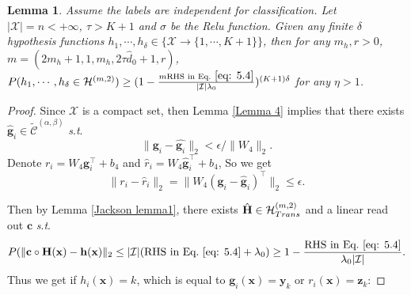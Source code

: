 \documentclass{article}
\theoremstyle{plain}
\newtheorem{lemma}[theorem]{Lemma}
\theoremstyle{definition}
\theoremstyle{remark}
\begin{document}
\begin{lemma}
    Assume the labels are independent for classification. Let $|\mathcal{X}|=n<+\infty$, $\tau>K+1$ and $\sigma$ be the {\rm Relu} function. Given any finite $\delta$ hypothesis functions $h_1,\cdots,h_{\delta}\in \{\mathcal{X}\xrightarrow{}\{1,\cdots,K+1\}\}$, then for any $m_h,r>0$, $m=(2m_h+1,1,m_h,2\tau \hat{d}_0+1,r)$, $P(h_1,\cdots,h_{\delta}\in \mathcal{H}^{(m,2)})\geq (1-\frac{m\text{RHS~in~Eq.}~\eqref{eq: 5.4}}{|\mathcal{I}|\lambda_0})^{(K+1)\delta}$ for any $\eta>1$.
    \label{Lemma 5}
\end{lemma}


\begin{proof}
    Since $\mathcal{X}$ is a compact set, then Lemma \ref{Lemma 4} implies that there exists $\hat{\mathbf{g}}_i \in \widetilde{\mathcal{C}}^{(\alpha, \beta)}$ \textit{s}.\textit{t}.
    \begin{equation}
        \|\mathbf{g}_i - \hat{\mathbf{g}_i}\|_2 < \epsilon / \|W_4\|_2.
    \end{equation}
    Denote $r_i = W_4\mathbf{g}_i^{\top}+b_4$ and $\hat{r}_i = W_4\hat{\mathbf{g}}_i^{\top}+b_4$,
    So we get
    \begin{equation}
       \|r_i -\hat{r}_i \|_2=\|W_4(\mathbf{g}_i-\hat{\mathbf{g}}_i)^{\top}\|_2\leq \epsilon.
    \end{equation}
    
    Then by Lemma \ref{Jackson lemma1}, there exists $\hat{\mathbf{H}} \in \mathcal{H}_{\rm Trans}^{(m,2)}$ and a linear read out $\mathbf{c}$ \textit{s}.\textit{t}. 
   \begin{equation}   
    P(\|\mathbf{c}\circ\mathbf{H}(\mathbf{x})-\mathbf{h}(\mathbf{x})\|_2\leq|\mathcal{I}|(\text{RHS~in~Eq.}~\eqref{eq: 5.4}+\lambda_0)\geq 1 - \frac{\text{RHS~in~Eq.}~\eqref{eq: 5.4}}{\lambda_0|\mathcal{I}|}.
    \label{eq: 5.6}
    \end{equation}
    Thus we get if $h_i(\mathbf{x})=k$, which is equal to $\mathbf{g}_i(\mathbf{x})=\mathbf{y}_k$ or $r_i(\mathbf{x})=\mathbf{z}_k$:
    

\end{proof}
\end{document}
